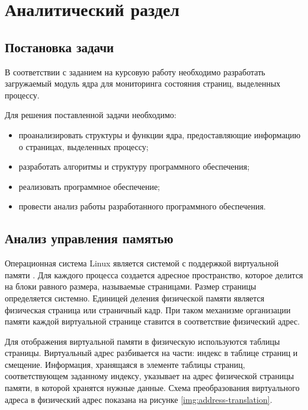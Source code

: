 \chapter{Аналитический раздел}

\section{Постановка задачи}

В соответствии с заданием на курсовую работу необходимо разработать загружаемый модуль ядра для мониторинга состояния страниц, выделенных процессу.

Для решения поставленной задачи необходимо:

\begin{itemize}
	\item проанализировать структуры и функции ядра, предоставляющие информацию о страницах, выделенных процессу;
	\item разработать алгоритмы и структуру программного обеспечения;
	\item реализовать программное обеспечение;
	\item провести анализ работы разработанного программного обеспечения.
\end{itemize}

\section{Анализ управления памятью}

Операционная система Linux является системой с поддержкой виртуальной памяти \cite{love}. Для каждого процесса создается адресное пространство, которое делится на блоки равного размера, называемые страницами. Размер страницы определяется системно. Единицей деления физической памяти является физическая страница или страничный кадр. При таком механизме организации памяти каждой виртуальной странице ставится в соответствие физический адрес.

Для отображения виртуальной памяти в физическую используются таблицы страницы. Виртуальный адрес разбивается на части: индекс в таблице страниц и смещение. Информация, хранящаяся в элементе таблицы страниц, соответствующем заданному индексу, указывает на адрес физической страницы памяти, в которой хранятся нужные данные. Схема преобразования виртуального адреса в физический адрес показана на рисунке \ref{img:address-translation}.

